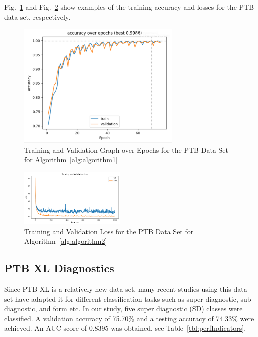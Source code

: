 \documentclass{ieeeaccess}
\begin{document}
Fig.~\ref{fig:trainigValidationGraph} and Fig.~\ref{fig:trainingAndValidationLossAttentionModel} show examples of the training accuracy and losses for the PTB data set, respectively.
\begin{figure}[!ht]	
\caption{Training and Validation Graph over Epochs for the PTB Data Set for Algorithm~\ref{alg:algorithm1}}
\label{fig:trainigValidationGraph}
\centerline{\includegraphics[width=18.5pc]{Definitions/PTB_training.png}}
\end{figure}


\begin{figure}[!ht] %
\includegraphics[width=0.45\textwidth]{Images/TrainingValidationLossAttention}
\caption{Training and Validation Loss for the PTB Data Set for Algorithm~\ref{alg:algorithm2}}
\label{fig:trainingAndValidationLossAttentionModel}
\end{figure}    

\subsection{PTB XL Diagnostics}
Since PTB XL is a relatively new data set, many recent studies using this data set have adapted it for different classification tasks such as super diagnostic, sub-diagnostic, and form etc. In our study, five super diagnostic (SD) classes were classified. A validation accuracy of 75.70\% and a testing accuracy of 74.33\% were achieved. An AUC score of 0.8395 was obtained, see Table~\ref{tbl:perfIndicators}. 
\end{document}
